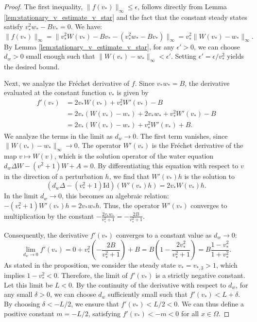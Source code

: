 \documentclass[preprint,12pt]{elsarticle}
\theoremstyle{plain}
\theoremstyle{definition}
\theoremstyle{remark}
\begin{document}
\begin{proof}
    The first inequality, $\|f(v_*)\|_\infty \leq \epsilon$, follows directly from Lemma \ref{lem:stationary_v_estimate_v_star} and the fact that the constant steady states satisfy $v_*^2w_* - Bv_* = 0$. We have:
    \begin{equation*}
        \|f(v_*)\|_\infty 
        =
        \|v_*^2W(v_*) - Bv_* - (v_*^2w_* - Bv_*)\|_\infty
        =
        v_*^2\|W(v_*) - w_*\|_\infty.
    \end{equation*}
    By Lemma \ref{lem:stationary_v_estimate_v_star}, for any $\epsilon' > 0$, we can choose $d_w > 0$ small enough such that $\|W(v_*) - w_*\|_\infty < \epsilon'$. Setting $\epsilon' = \epsilon / v_*^2$ yields the desired bound.

    Next, we analyze the Fr\'echet derivative of $f$. Since $v_*w_* = B$, the derivative evaluated at the constant function $v_*$ is given by
    \begin{align*}
        f'(v_*) 
        &=
        2v_*W(v_*) + v_*^2W'(v_*) - B \\
        &=
        2v_*(W(v_*) - w_*) + 2v_*w_* + v_*^2W'(v_*) - B \\
        &=
        2v_*(W(v_*) - w_*) + v_*^2W'(v_*) + B.
    \end{align*}
    We analyze the terms in the limit as $d_w \to 0$. The first term vanishes, since $\|W(v_*) - w_*\|_\infty \to 0$. The operator $W'(v_*)$ is the Fr\'echet derivative of the map $v \mapsto W(v)$, which is the solution operator of the water equation $d_w \Delta W - (v^2+1)W + A = 0$. By differentiating this equation with respect to $v$ in the direction of a perturbation $h$, we find that $W'(v_*)h$ is the solution to
    \begin{equation*}
        (d_w \Delta - (v_*^2+1)\mathrm{Id})(W'(v_*)h) = 2v_* W(v_*) h.
    \end{equation*}
    In the limit $d_w \to 0$, this becomes an algebraic relation: $-(v_*^2+1)W'(v_*)h = 2v_* w_* h$. Thus, the operator $W'(v_*)$ converges to multiplication by the constant $-\frac{2v_*w_*}{v_*^2+1} = -\frac{2B}{v_*^2+1}$.
    
    Consequently, the derivative $f'(v_*)$ converges to a constant value as $d_w \to 0$:
    \begin{equation*}
        \lim_{d_w \to 0} f'(v_*) = 0 + v_*^2 \left( -\frac{2B}{v_*^2+1} \right) + B = B \left( 1 - \frac{2v_*^2}{v_*^2+1} \right) = B \frac{1-v_*^2}{1+v_*^2}.
    \end{equation*}
    As stated in the proposition, we consider the steady state $v_* = v_{*,3} > 1$, which implies $1 - v_*^2 < 0$. Therefore, the limit of $f'(v_*)$ is a strictly negative constant. Let this limit be $L < 0$. By the continuity of the derivative with respect to $d_w$, for any small $\delta > 0$, we can choose $d_w$ sufficiently small such that $f'(v_*) < L + \delta$. By choosing $\delta < -L/2$, we ensure that $f'(v_*) < L/2 < 0$. We can thus define a positive constant $m = -L/2$, satisfying $f'(v_*) < -m < 0$ for all $x \in \Omega$.


\end{proof}
\end{document}
